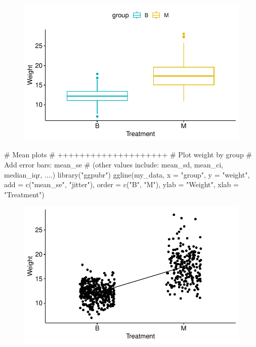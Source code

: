 \documentclass[
  letterpaper,
  DIV=11,
  numbers=noendperiod]{scrartcl}
\newenvironment{Shaded}{\begin{snugshade}}{\end{snugshade}}
\newcommand{\AttributeTok}[1]{\textcolor[rgb]{0.40,0.45,0.13}{#1}}
\newcommand{\CommentTok}[1]{\textcolor[rgb]{0.37,0.37,0.37}{#1}}
\newcommand{\FunctionTok}[1]{\textcolor[rgb]{0.28,0.35,0.67}{#1}}
\newcommand{\NormalTok}[1]{\textcolor[rgb]{0.00,0.23,0.31}{#1}}
\newcommand{\StringTok}[1]{\textcolor[rgb]{0.13,0.47,0.30}{#1}}
\begin{document}
\begin{figure}[H]

{\centering \includegraphics{ANOVA_files/figure-pdf/unnamed-chunk-4-1.pdf}

}

\end{figure}

\begin{Shaded}
\begin{Highlighting}[]
\CommentTok{\# Mean plots}
\CommentTok{\# ++++++++++++++++++++}
\CommentTok{\# Plot weight by group}
\CommentTok{\# Add error bars: mean\_se}
\CommentTok{\# (other values include: mean\_sd, mean\_ci, median\_iqr, ....)}
\FunctionTok{library}\NormalTok{(}\StringTok{"ggpubr"}\NormalTok{)}
\FunctionTok{ggline}\NormalTok{(my\_data, }\AttributeTok{x =} \StringTok{"group"}\NormalTok{, }\AttributeTok{y =} \StringTok{"weight"}\NormalTok{, }
       \AttributeTok{add =} \FunctionTok{c}\NormalTok{(}\StringTok{"mean\_se"}\NormalTok{, }\StringTok{"jitter"}\NormalTok{), }
       \AttributeTok{order =} \FunctionTok{c}\NormalTok{(}\StringTok{"B"}\NormalTok{, }\StringTok{"M"}\NormalTok{),}
       \AttributeTok{ylab =} \StringTok{"Weight"}\NormalTok{, }\AttributeTok{xlab =} \StringTok{"Treatment"}\NormalTok{)}
\end{Highlighting}
\end{Shaded}

\begin{figure}[H]

{\centering \includegraphics{ANOVA_files/figure-pdf/unnamed-chunk-5-1.pdf}

}

\end{figure}
\end{document}
